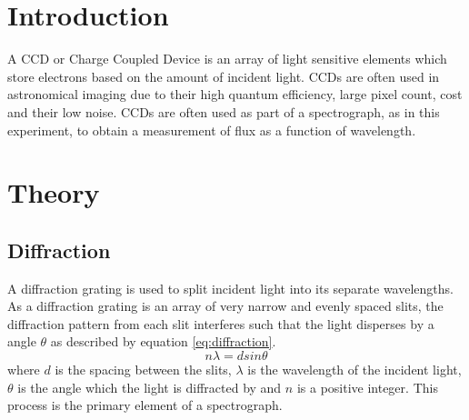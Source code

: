 \documentclass[a4paper,12pt,twocolumn]{article}
\let\cite=\supercite
\begin{document}
	
	\section{Introduction}
		A CCD or Charge Coupled Device is an array of light sensitive elements which store electrons based on the amount of incident light\cite{specInst}. CCDs are often used in astronomical imaging due to their high quantum efficiency, large pixel count, cost and their low noise. CCDs are often used as part of a spectrograph, as in this experiment, to obtain a measurement of flux as a function of wavelength\cite{manual}.
	
	\section{Theory}
		\subsection{Diffraction}
			A diffraction grating is used to split incident light into its separate wavelengths. As a diffraction grating is an array of very narrow and evenly spaced slits, the diffraction pattern from each slit interferes such that the light disperses by a angle $\theta$ as described by equation \ref{eq:diffraction}\cite{universityPhysics}.
			\begin{equation}
				n \lambda = d sin\theta
				\label{eq:diffraction}
			\end{equation} where $d$ is the spacing between the slits, 	$\lambda$ is the wavelength of the incident light, $\theta$ is the angle which the light is diffracted by and $n$ is a positive integer. This process is the primary element of a spectrograph.\\
		
\end{document}
